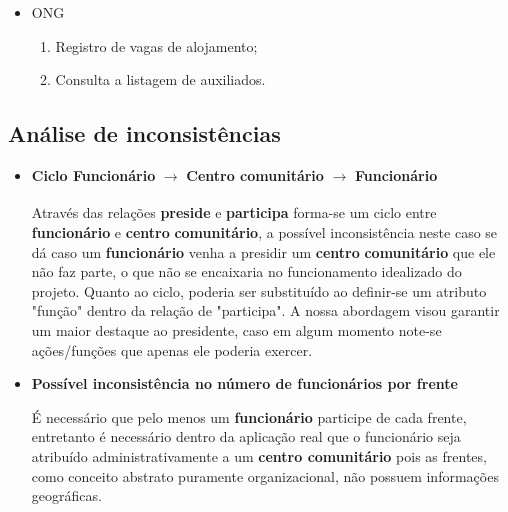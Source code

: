 \begin{itemize}
    \item ONG
        \begin{enumerate}
            \item Registro de vagas de alojamento;
            \item Consulta a listagem de auxiliados.
        \end{enumerate}
\end{itemize}

\subsection{Análise de inconsistências}
\begin{itemize}
    \item \textbf{Ciclo Funcionário} $\xrightarrow[]{}$ \textbf{\textbf{Centro comunitário}} $\xrightarrow[]{}$ \textbf{Funcionário}
    
    Através das relações \textbf{preside} e \textbf{participa} forma-se um ciclo entre \textbf{funcionário} e \textbf{centro} \textbf{comunitário}, a possível inconsistência neste caso se dá caso um \textbf{funcionário} venha a presidir um \textbf{centro} \textbf{comunitário} que ele não faz parte, o que não se encaixaria no funcionamento idealizado do projeto. Quanto ao ciclo, poderia ser substituído ao definir-se um atributo "função" dentro da relação de "participa". A nossa abordagem visou garantir um maior destaque ao presidente, caso em algum momento note-se ações/funções que apenas ele poderia exercer.
    \item \textbf{Possível inconsistência no número de funcionários por frente}
    
    É necessário que pelo menos um \textbf{funcionário} participe de cada frente, entretanto é necessário dentro da aplicação real que o funcionário seja atribuído administrativamente a um \textbf{centro comunitário} pois as frentes, como conceito abstrato puramente organizacional, não possuem informações geográficas.
    
\end{itemize}

\newpage

